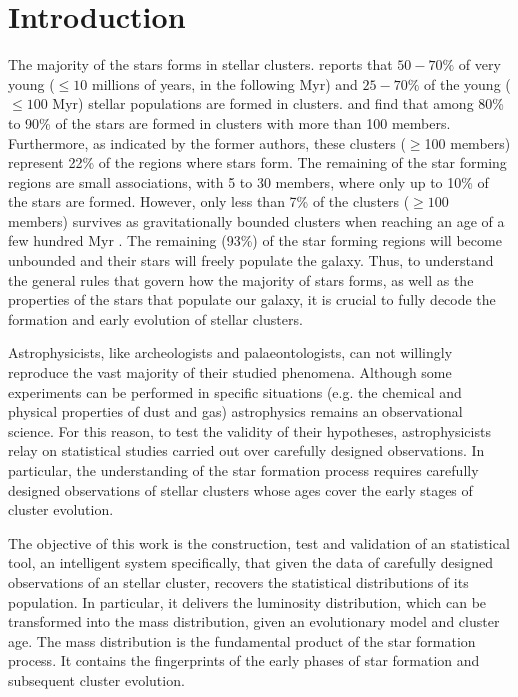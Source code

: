 \chapter{Introduction}
\label{chap:introduction}

The majority of the stars forms in stellar clusters. \citet{2000AJ....120.3139C} reports that $50-70\%$ of very young ($\leq10$ millions of years, in the following Myr) and $25-70\%$ of the young ($\leq100$ Myr) stellar populations are formed in clusters. \citet{2003AJ....126.1916P} and \citet{2003ARA&A..41...57L} find that among 80\% to 90\% of the stars are formed in clusters with more than 100 members. Furthermore, as indicated by the former authors, these clusters ($\geq$100 members) represent 22\% of the regions where stars form. The remaining of the star forming regions are small associations, with 5 to 30 members, where only up to 10\% of the stars are formed. However, only less than 7\% of the clusters ($\geq 100$ members) survives as gravitationally bounded clusters when reaching an age of a few hundred Myr \citep{2003ARA&A..41...57L}. The remaining (93\%) of the star forming regions will become unbounded and their stars will freely populate the galaxy. Thus, to understand the general rules that govern how the majority of stars forms, as well as the properties of the stars that populate our galaxy, it is crucial to fully decode the formation and early evolution of stellar clusters. 

Astrophysicists, like archeologists and palaeontologists, can not willingly reproduce the vast majority of their studied phenomena. Although some experiments can be performed in specific situations (e.g. the chemical and physical  properties of dust and gas) astrophysics remains an observational science. For this reason, to test the validity of their hypotheses, astrophysicists relay on statistical studies carried out over carefully designed observations. In particular, the understanding of the star formation process requires carefully designed observations of  stellar clusters whose ages cover the early stages of cluster evolution.

The objective of this work is the construction, test and validation of an statistical tool, an intelligent system specifically, that given the data of carefully designed observations of an stellar cluster, recovers the statistical distributions of its population. In particular, it delivers the luminosity distribution, which can be transformed into the mass distribution, given an evolutionary model and cluster age. The mass distribution is the fundamental product of the star formation process. It contains the fingerprints of the early phases of star formation and subsequent cluster evolution.

